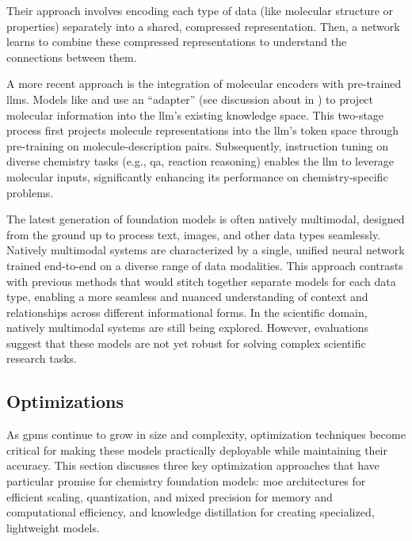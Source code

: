Their approach involves encoding each type of data (like molecular structure or properties) separately into a shared, compressed representation. 
Then, a network learns to combine these compressed representations to understand the connections between them. 

A more recent approach is the integration of molecular encoders with pre-trained \glspl{llm}. 
Models like  \autocite{cao2023instructmol0} and  \autocite{li2024seeing} use an \enquote{adapter} (see discussion about  in ) to project molecular information into the \gls{llm}'s existing knowledge space. 
This two-stage process first projects molecule representations into the \gls{llm}'s token space through pre-training on molecule-description pairs. 
Subsequently, instruction tuning on diverse chemistry tasks (e.g., \gls{qa}, reaction reasoning) enables the \gls{llm} to leverage molecular inputs, significantly enhancing its performance on chemistry-specific problems.


The latest generation of foundation models is often natively multimodal, designed from the ground up to process text, images, and other data types seamlessly. 
Natively multimodal systems are characterized by a single, unified neural network trained end-to-end on a diverse range of data modalities. 
This approach contrasts with previous methods that would stitch together separate models for each data type, enabling a more seamless and nuanced understanding of context and relationships across different informational forms. 
In the scientific domain, natively multimodal systems are still being explored. However, evaluations suggest that these models are not yet robust for solving complex scientific research tasks.\autocite{alampara2024probing}


\subsection{Optimizations}

As \glspl{gpm} continue to grow in size and complexity, optimization techniques become critical for making these models practically deployable while maintaining their accuracy. 
This section discusses three key optimization approaches that have particular promise for chemistry foundation models: \gls{moe} architectures for efficient scaling, quantization, and mixed precision for memory and computational efficiency, and knowledge distillation for creating specialized, lightweight models.


